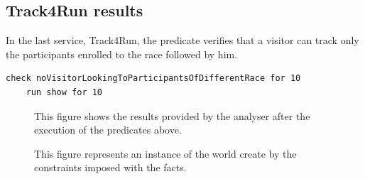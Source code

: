     \subsection{Track4Run results}
    In the last service, Track4Run, the predicate verifies that a visitor can track only the participants enrolled to the race followed by him.
   
\begin{lstlisting}[language=alloy]
    check noVisitorLookingToParticipantsOfDifferentRace for 10
    run show for 10
\end{lstlisting} 
    
    \begin{figure}[H]
        \centering
        \caption{This figure shows the results provided by the analyser after the execution of the predicates above. }
        \label{ fig:T4R-Results }
    \end{figure}
    
    \begin{figure}[H]
        \centering
        \caption{ This figure represents an instance of the world create by the constraints imposed with the facts. }
        \label{ fig:T4R-model }
    \end{figure}

